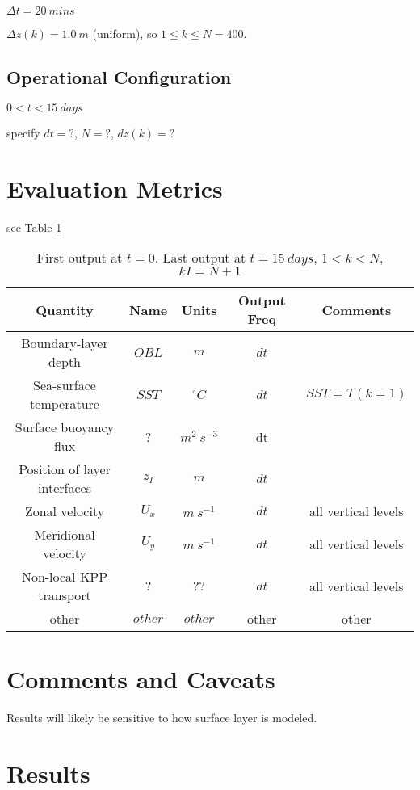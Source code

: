 \documentclass[fleqn, 12pt]{report}
\begin{document}
 $\Delta t = 20~mins$

 $\Delta z(k) = 1.0~m$ (uniform), so $1 \le k \le N=400$.
 

\subsection{Operational Configuration}
 $0<t<15 \ days$
 
 specify $dt=?$, $N=?$, $dz(k)=?$

\section{Evaluation Metrics}
see Table \ref{table:metricsShear}

\begin{table}[htdp]
\caption{First output at $t=0$. Last output at $t=15 \ days$, $1<k<N$, $kI=N+1$}
\begin{center}
\begin{tabular}{c c c c c}
\hline
Quantity & Name & Units & Output Freq & Comments \\
\hline
Boundary-layer depth & $OBL$ & $m$ & $dt$ &  \\
Sea-surface temperature & $SST$ & $^{\circ}C$ & $dt$ & $SST=T(k=1)$\\
Surface buoyancy flux & ? & $m^2 \ s^{-3}$ & dt & \\
Position of layer interfaces & $z_I$ & $m$ & $dt$ &  \\
Zonal velocity & $U_x$ & $m \ s^{-1}$ & $dt$ &  all vertical levels \\
Meridional velocity & $U_y$ & $m \ s^{-1}$ & $dt$ &  all vertical levels \\
Non-local KPP transport & $?$ & $??$ & $dt$ & all vertical levels \\
other & $other$ & $other$ & other & other\\
\hline
\end{tabular}
\end{center}
\label{table:metricsShear}
\end{table}

\section{Comments and Caveats}
Results will likely be sensitive to how surface layer is modeled.

\section{Results}
\end{document}
